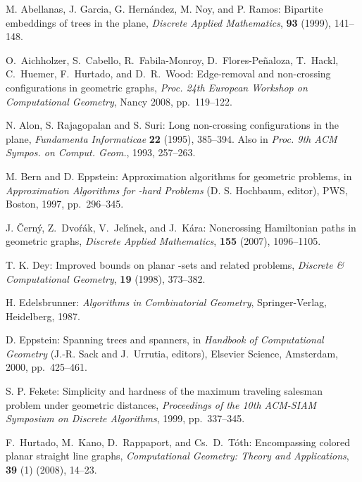 \documentclass[proceedings]{stacs}
\begin{document}
\begin{thebibliography}{10} 

 M. Abellanas, J. Garcia, G. Hern\'andez,
M. Noy, and P. Ramos:
Bipartite embeddings of trees in the plane,
{\em Discrete Applied Mathematics}, {\bf 93} (1999), 141--148.

O.~Aichholzer, S.~Cabello, R.~Fabila-Monroy, D.~Flores-Pe\~naloza,
T.~Hackl, C.~Huemer, F.~Hurtado, and D.~R.~Wood:
Edge-removal and non-crossing configurations in geometric graphs,
{\em Proc. 24th European Workshop on Computational Geometry}, Nancy 2008,
pp.~119--122.

 N. Alon, S. Rajagopalan and S. Suri:
Long non-crossing configurations in the plane,
{\em Fundamenta Informaticae} {\bf 22} (1995), 385--394.
Also in {\em Proc. 9th ACM Sympos. on Comput. Geom.},
1993, 257--263.





 M. Bern and D. Eppstein:
Approximation algorithms for geometric problems,
in {\em Approximation Algorithms for -hard Problems}
(D. S. Hochbaum, editor), PWS, Boston, 1997, pp.~296--345.



J. \v{C}ern\'y, Z.~Dvo\'r\'ak, V.~Jel\'{\i}nek, and J.~K\'ara:
Noncrossing {H}amiltonian paths in geometric graphs,
{\em Discrete Applied Mathematics}, {\bf 155} (2007), 1096--1105.

 T. K. Dey:
Improved bounds on planar -sets and related problems,
{\em Discrete \& Computational Geometry}, {\bf 19} (1998), 373--382.

 H. Edelsbrunner:
{\em Algorithms in Combinatorial Geometry},
Springer-Verlag, Heidelberg, 1987.



 D. Eppstein:
Spanning trees and spanners,
in {\em Handbook of Computational Geometry}
(J.-R. Sack and J.~Urrutia, editors),
Elsevier Science, Amsterdam, 2000, pp.~425--461.





 S. P. Fekete:
Simplicity and hardness of the maximum traveling salesman problem
under geometric distances, 
{\em Proceedings of the 10th ACM-SIAM Symposium on Discrete Algorithms},
1999, pp.~337--345.

F.~Hurtado, M.~Kano, D.~Rappaport, and Cs.~D.~T\'oth:
Encompassing colored planar straight line graphs,
{\em Computational Geometry: Theory and Applications}, {\bf 39} (1) (2008), 14--23.






\end{thebibliography}
\end{document}
